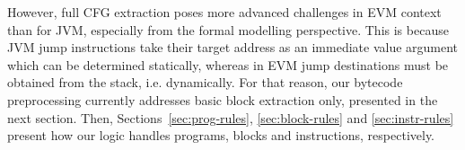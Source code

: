 \documentclass[sigplan,10pt,review]{acmart}\settopmatter{printfolios=true,printccs=false,printacmref=false}
\newcommand{\ttrip}[5]{\mathit{#1} \vdash_{\mathrm{#2}}[#3]\:#4\:[#5]}
\begin{document}
However, full CFG extraction poses more advanced challenges in EVM context than for JVM,
especially from the formal modelling perspective.
This is because JVM jump instructions
take their target address as an immediate value argument which can be determined statically,
whereas in EVM jump destinations
must be obtained from the stack, i.e. dynamically. For that reason, our bytecode preprocessing
currently addresses basic block extraction only, presented in the next section.
Then, Sections~\ref{sec:prog-rules}, \ref{sec:block-rules} and \ref{sec:instr-rules} 
present how our logic handles programs, blocks and instructions, respectively. 
%
%       
%
%
\end{document}
